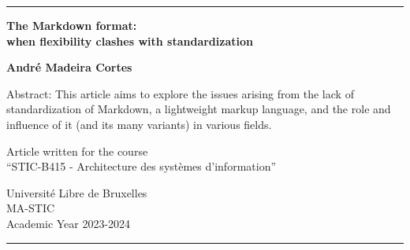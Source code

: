 \begin{titlepage}
	\center

	\rule{\linewidth}{1pt} %

	\vspace{2cm}

	\Large \textbf{
		The Markdown format: \\ \vspace{0.2cm} when flexibility clashes with standardization
	}

	\vspace{2cm}

	\large \textbf{ André Madeira Cortes }

	\vspace{3cm}

	Abstract: This article aims to explore the issues arising from the lack of standardization of Markdown, a lightweight markup language,
	and the role and influence of it (and its many variants) in various fields.

	\vspace{3cm}

	Article written for the course \\ ``STIC-B415 - Architecture des systèmes d'information'' \\

	\vspace{0.8cm}

	Université Libre de Bruxelles\\
	MA-STIC \\
	Academic Year 2023-2024

	\rule{\linewidth}{1pt} %
\end{titlepage}